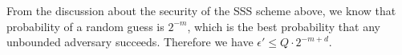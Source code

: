 \documentclass[envcountsame,runningheads,notitlepage]{llncs}
\begin{document}
	\begin{rmrk}
		From the discussion about the security of the SSS scheme above, we know that probability of a random guess is $2^{-m}$, which is the best probability that any unbounded adversary succeeds. Therefore we have $\epsilon' \leq Q \cdot 2^{-m+d}$. 
	\end{rmrk}
	
	
	
	
\end{document}
